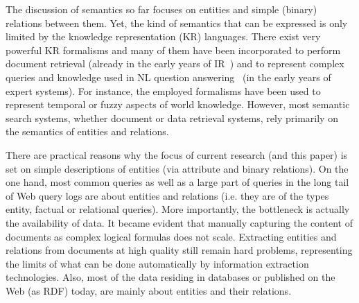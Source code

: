 The discussion of semantics so far focuses on entities and simple (binary) relations between them. Yet, the kind of semantics that can be expressed is only limited by the knowledge representation (KR) languages. There exist very powerful KR formalisms and many of them have been incorporated to perform document retrieval (already in the early years of IR~\cite{DBLP:conf/sigir/Rijsbergen89}) and to represent complex queries and knowledge used in NL question answering~\cite{DBLP:journals/tkde/VassiliadisTK94} (in the early years of expert systems). For instance, the employed formalisms have been used to represent temporal or fuzzy aspects of world knowledge. However, most semantic search systems, whether document or data retrieval systems, rely primarily on the semantics of entities and relations. 

There are practical reasons why the focus of current research (and this paper) is set on simple descriptions of entities (via attribute and binary relations). On the one hand, 
most common queries as well as a large part of queries in the long tail of Web query logs 
are about entities and relations (i.e. they are of the types entity, factual or relational queries). More importantly, the bottleneck is actually the availability of data. It became evident that manually capturing the content of documents as complex logical formulas does not scale. Extracting entities and relations from documents at high quality still remain hard problems, representing the limits of what can be done automatically by information extraction technologies. Also, most of the data residing in databases or published on the Web (as RDF) today, are mainly about entities and their relations. 


